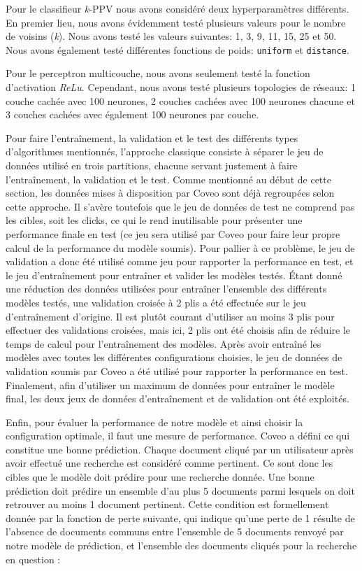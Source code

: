 Pour le classifieur \textit{k}-PPV nous avons considéré deux hyperparamètres différents. En premier lieu, nous avons évidemment testé plusieurs valeurs pour le nombre de voisins (\textit{k}). Nous avons testé les valeurs suivantes: 1, 3, 9, 11, 15, 25 et 50. 
Nous avons également testé différentes fonctions de poids: \texttt{uniform} et \texttt{distance}.

Pour le perceptron multicouche, nous avons seulement testé la fonction d'activation \textit{ReLu}. Cependant, nous avons testé plusieurs topologies de réseaux: 1 couche cachée avec 100 neurones, 2 couches cachées avec 100 neurones chacune et 3 couches cachées avec également 100 neurones par couche.
\break

Pour faire l'entraînement, la validation et le test des différents types d'algorithmes mentionnés, l'approche classique consiste à séparer le jeu de données utilisé en trois partitions, chacune servant justement à faire l'entraînement, la validation et le test. 
Comme mentionné au début de cette section, les données mises à disposition par Coveo sont déjà regroupées selon cette approche. 
Il s'avère toutefois que le jeu de données de test ne comprend pas les cibles, soit les clicks, ce qui le rend inutilisable pour présenter une performance finale en test (ce jeu sera utilisé par Coveo pour faire leur propre calcul de la performance du modèle soumis). 
Pour pallier à ce problème, le jeu de validation a donc été utilisé comme jeu pour rapporter la performance en test, et le jeu d'entraînement pour entraîner et valider les modèles testés. 
Étant donné une réduction des données utilisées pour entraîner l'ensemble des différents modèles testés, une validation croisée à 2 plis a été effectuée sur le jeu d'entraînement d'origine. Il est plutôt courant d'utiliser au moins 3 plis pour effectuer des validations croisées, mais ici, 2 plis ont été choisis afin de réduire le temps de calcul pour l'entraînement des modèles. 
Après avoir entraîné les modèles avec toutes les différentes configurations choisies, le jeu de données de validation soumis par Coveo a été utilisé pour rapporter la performance en test. Finalement, afin d'utiliser un maximum de données pour entraîner le modèle final, les deux jeux de données d'entraînement et de validation ont été exploités.
\break

Enfin, pour évaluer la performance de notre modèle et ainsi choisir la configuration optimale, il faut une mesure de performance. 
Coveo a défini ce qui constitue une bonne prédiction. 
Chaque document cliqué par un utilisateur après avoir effectué une recherche est considéré comme pertinent. Ce sont donc les cibles que le modèle doit prédire pour une recherche donnée. 
Une bonne prédiction doit prédire un ensemble d'au plus 5 documents parmi lesquels on doit retrouver au moins 1 document pertinent. Cette condition est formellement donnée par la fonction de perte suivante, qui indique qu'une perte de 1 résulte de l'absence de documents communs entre l'ensemble de 5 documents renvoyé par notre modèle de prédiction, et l'ensemble des documents cliqués pour la recherche en question :

